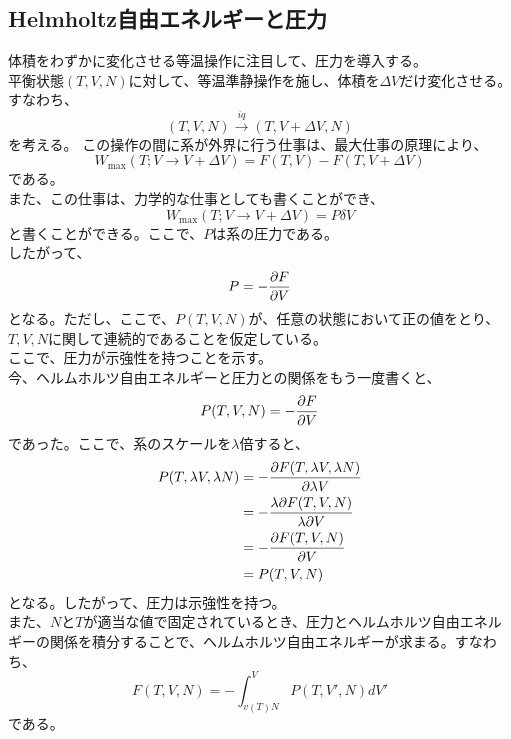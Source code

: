 \documentclass[a4paper,11pt]{jsarticle}
\begin{document}
\subsection{Helmholtz自由エネルギーと圧力}
体積をわずかに変化させる等温操作に注目して、圧力を導入する。\\
平衡状態$(T,V,N)$に対して、等温準静操作を施し、体積を$\Delta V$だけ変化させる。すなわち、
\begin{equation}
    (T,V,N) \xrightarrow{iq} (T,V+\Delta V,N)
\end{equation}
を考える。
この操作の間に系が外界に行う仕事は、最大仕事の原理により、
\begin{equation}
    W_{\text{max}}(T;V\rightarrow V+\Delta V) = F(T,V)-F(T,V+\Delta V)
\end{equation}
である。\\
また、この仕事は、力学的な仕事としても書くことができ、
\begin{equation}
    W_{\text{max}}(T;V\rightarrow V+\Delta V) = P\delta V
\end{equation}
と書くことができる。ここで、$P$は系の圧力である。\\
したがって、
\begin{equation}
    P = -\pdv{F}{V}
\end{equation}
となる。ただし、ここで、$P(T,V,N)$が、任意の状態において正の値をとり、$T,V,N$に関して連続的であることを仮定している。\\
ここで、圧力が示強性を持つことを示す。\\
今、ヘルムホルツ自由エネルギーと圧力との関係をもう一度書くと、
\begin{equation}
    P(T,V,N) = -\pdv{F}{V}
\end{equation}
であった。ここで、系のスケールを$\lambda$倍すると、
\begin{align}
    P(T,\lambda V,\lambda N) &= -\pdv{F(T,\lambda V,\lambda N)}{\lambda V}\\
    &= -\frac{\lambda \partial F(T,V,N)}{\lambda \partial V}\\
    &= -\pdv{F(T,V,N)}{V}\\
    &= P(T,V,N)
\end{align}
となる。したがって、圧力は示強性を持つ。\\

また、$N$と$T$が適当な値で固定されているとき、圧力とヘルムホルツ自由エネルギーの関係を積分することで、ヘルムホルツ自由エネルギーが求まる。すなわち、
\begin{equation}
    F(T,V,N) = -\int_{v(T)N}^{V}P(T,V',N)dV'
\end{equation}
である。\\
\end{document}
